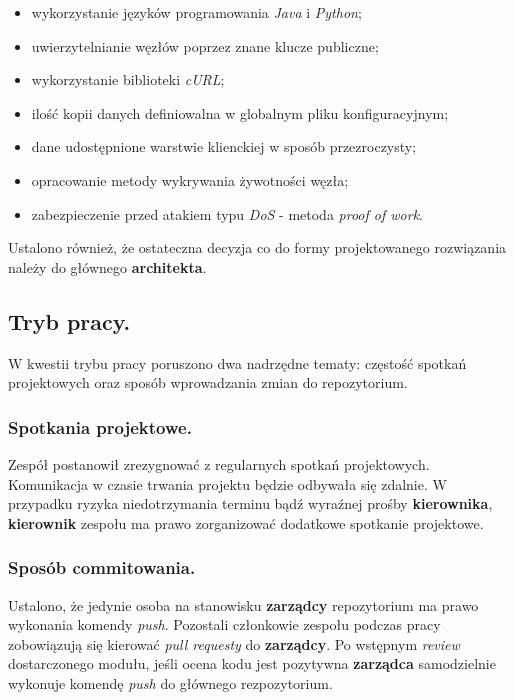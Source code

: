 \documentclass[a4paper,11pt]{article}
\begin{document}
  \begin{itemize}
    \item wykorzystanie języków programowania \textit{Java} i \textit{Python};
    \item uwierzytelnianie węzłów poprzez znane klucze publiczne;
    \item wykorzystanie biblioteki \textit{cURL};
    \item ilość kopii danych definiowalna w globalnym pliku konfiguracyjnym;
    \item dane udostępnione warstwie klienckiej w sposób przezroczysty;
    \item opracowanie metody wykrywania żywotności węzła;
    \item zabezpieczenie przed atakiem typu \textit{DoS} - metoda \textit{proof of work}.
  \end{itemize}
  
  Ustalono również, że ostateczna decyzja co do formy projektowanego rozwiązania należy do głównego \textbf{architekta}.

\subsection{Tryb pracy.}
  W kwestii trybu pracy poruszono dwa nadrzędne tematy: częstość spotkań projektowych oraz sposób wprowadzania zmian do repozytorium.
  
\subsubsection{Spotkania projektowe.}
  Zespół postanowił zrezygnować z regularnych spotkań projektowych.
  Komunikacja w czasie trwania projektu będzie odbywała się zdalnie.
  W przypadku ryzyka niedotrzymania terminu bądź wyraźnej prośby \textbf{kierownika}, \textbf{kierownik} zespołu ma prawo zorganizować dodatkowe spotkanie projektowe.

\subsubsection{Sposób commitowania.}
  Ustalono, że jedynie osoba na stanowisku \textbf{zarządcy} repozytorium ma prawo wykonania komendy \textit{push}.
  Pozostali członkowie zespołu podczas pracy zobowiązują się kierować \textit{pull requesty} do \textbf{zarządcy}.
  Po wstępnym \textit{review} dostarczonego modułu, jeśli ocena kodu jest pozytywna \textbf{zarządca} samodzielnie wykonuje komendę \textit{push} do głównego rezpozytorium.
  
\end{document}
